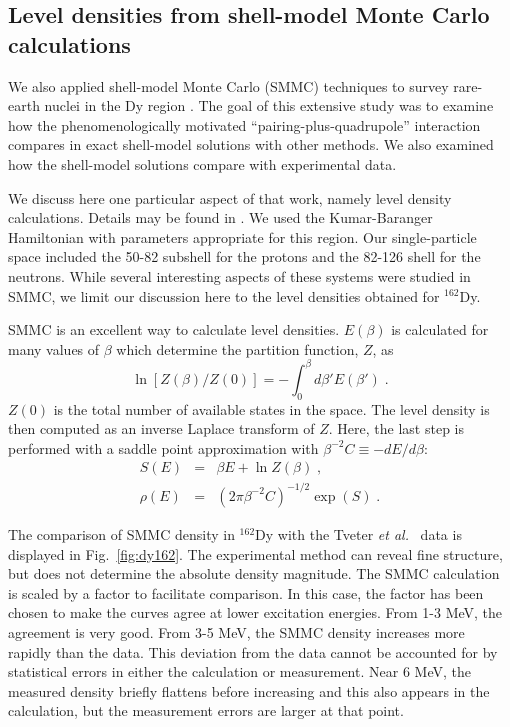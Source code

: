 \documentclass[rmp,aps,floatfix]{revtex4}
\begin{document}
\subsection{Level densities from shell-model Monte Carlo calculations}

We also applied shell-model Monte Carlo (SMMC) 
techniques to survey rare-earth nuclei
in the Dy region \cite{WK00}. The goal of this extensive study 
was to examine how the phenomenologically motivated ``pairing-plus-quadrupole''
interaction compares in exact shell-model solutions with other methods.
We also examined how the shell-model solutions compare with
experimental data.  

We discuss here one particular aspect of that work,
namely level density calculations. Details may be found in
\cite{WK00}.
We used the Kumar-Baranger Hamiltonian with parameters appropriate
for this region. Our single-particle space included the 50-82 subshell
for the protons and the 82-126 shell for the neutrons.
While several interesting aspects of these systems were studied in
SMMC, we limit our discussion here to the level densities obtained for
$^{162}$Dy.

SMMC is an excellent way to calculate level densities.  $E(\beta)$ is
calculated for many values of $\beta$ which determine the partition
function, $Z$, as
\begin{equation}
\ln[Z(\beta)/Z(0)]=-\int_0^\beta d\beta'E(\beta')\;.
\end{equation}
$Z(0)$ is the total number of available states in the space.  The
level density is then computed as an inverse
Laplace transform of $Z$.  Here, the last step is performed with a
saddle point approximation with $\beta^{-2}C\equiv -dE/d\beta$:
\begin{eqnarray}
S(E)& = & \beta E + \ln Z(\beta)\;, \\
\rho(E)&=&(2\pi\beta^{-2}C)^{-1/2}\exp(S)\;.
\label{eq:rho}
\end{eqnarray}

The comparison of SMMC density in $^{162}$Dy with the Tveter 
{\em et al.}~\cite{oslo2} data is displayed in Fig.~\ref{fig:dy162}.
The experimental
method can reveal fine structure, but does not determine the absolute
density magnitude.  The SMMC calculation is scaled by a factor to
facilitate comparison.  In this case, the factor has been chosen to
make the curves agree at lower excitation energies.  From 1-3 MeV,
the agreement is very good.  From 3-5 MeV, the SMMC density
increases more rapidly than the
data.  This deviation from the data cannot be accounted for by
statistical errors in either the calculation or measurement.  Near 6
MeV, the measured density briefly flattens before increasing and this
also appears in the calculation, but the measurement errors are larger
at that point.
\end{document}
